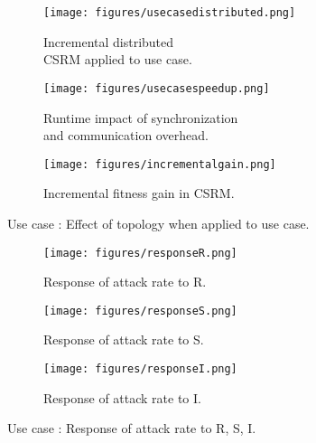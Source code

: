 \begin{figure}
    \begin{subfigure}{0.7\textwidth}
        \texttt{[image: figures/usecasedistributed.png]}
		\caption{Incremental distributed\\ CSRM applied to use case.}
		\label{fig:usecasedistributed}
    \end{subfigure}
    \begin{subfigure}{0.7\textwidth}
        \texttt{[image: figures/usecasespeedup.png]}
		\caption{Runtime impact of synchronization\\ and communication overhead.}
		\label{fig:usecasespeedup}
    \end{subfigure}
        \begin{subfigure}{0.7\textwidth}
        \texttt{[image: figures/incrementalgain.png]}
        \caption{Incremental fitness gain in CSRM.}
        \label{fig:incrementalgain}
    \end{subfigure}
	\caption{Use case : Effect of topology when applied to use case.}
\end{figure}
\begin{figure}
    \begin{subfigure}{0.7\textwidth}
        \texttt{[image: figures/responseR.png]}
        \caption{Response of attack rate to R.}
    \end{subfigure}
    \begin{subfigure}{0.7\textwidth}
        \texttt{[image: figures/responseS.png]}
        \caption{Response of attack rate to S.}
    \end{subfigure}
        \begin{subfigure}{0.7\textwidth}
        \texttt{[image: figures/responseI.png]}
        \caption{Response of attack rate to I.}
        \label{fig:usecaseresponseplots}
    \end{subfigure}
    \caption{Use case : Response of attack rate to R, S, I.}
\end{figure}

